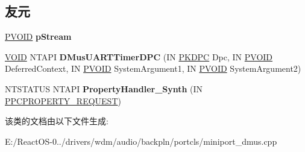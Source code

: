 \subsection*{友元}
\begin{DoxyCompactItemize}
\item 
\mbox{\label{class_c_miniport_d_mus_u_a_r_t_stream_a1592bfd88f7a8fc6a81fa2c18fcfa3eb}} 
\hyperlink{interfacevoid}{P\+V\+O\+ID} {\bfseries p\+Stream}
\item 
\mbox{\label{class_c_miniport_d_mus_u_a_r_t_stream_a21df57ae64bcd09cc62ccc2b5a15794a}} 
\hyperlink{interfacevoid}{V\+O\+ID} N\+T\+A\+PI {\bfseries D\+Mus\+U\+A\+R\+T\+Timer\+D\+PC} (IN \hyperlink{struct___k_d_p_c}{P\+K\+D\+PC} Dpc, IN \hyperlink{interfacevoid}{P\+V\+O\+ID} Deferred\+Context, IN \hyperlink{interfacevoid}{P\+V\+O\+ID} System\+Argument1, IN \hyperlink{interfacevoid}{P\+V\+O\+ID} System\+Argument2)
\item 
\mbox{\label{class_c_miniport_d_mus_u_a_r_t_stream_a3351f45412160d58e653d04bff785446}} 
N\+T\+S\+T\+A\+T\+US N\+T\+A\+PI {\bfseries Property\+Handler\+\_\+\+Synth} (IN \hyperlink{struct___p_c_p_r_o_p_e_r_t_y___r_e_q_u_e_s_t}{P\+P\+C\+P\+R\+O\+P\+E\+R\+T\+Y\+\_\+\+R\+E\+Q\+U\+E\+ST})
\end{DoxyCompactItemize}


该类的文档由以下文件生成\+:\begin{DoxyCompactItemize}
\item 
E\+:/\+React\+O\+S-\/0../drivers/wdm/audio/backpln/portcls/miniport\+\_\+dmus.\+cpp\end{DoxyCompactItemize}
